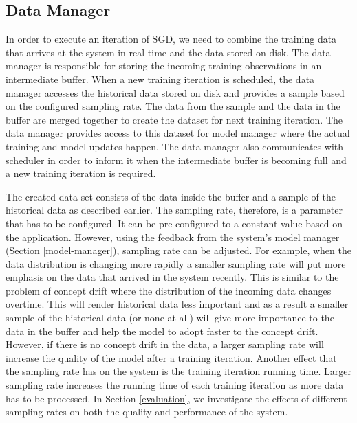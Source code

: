 \documentclass{vldb}
\begin{document}
\subsection{Data Manager} \label{data-manager}
In order to execute an iteration of SGD, we need to combine the training data that arrives at the system in real-time and the data stored on disk.
The data manager is responsible for storing the incoming training observations in an intermediate buffer.
When a new training iteration is scheduled, the data manager accesses the historical data stored on disk and provides a sample based on the configured sampling rate.
The data from the sample and the data in the buffer are merged together to create the dataset for next training iteration.
The data manager provides access to this dataset for model manager where the actual training and model updates happen.
The data manager also communicates with scheduler in order to inform it when the intermediate buffer is becoming full and a new training iteration is required. 

The created data set consists of the data inside the buffer and a sample of the historical data as described earlier.
The sampling rate, therefore, is a parameter that has to be configured.
It can be pre-configured to a constant value based on the application.
However, using the feedback from the system's model manager (Section \ref{model-manager}), sampling rate can be adjusted.
For example, when the data distribution is changing more rapidly a smaller sampling rate will put more emphasis on the data that arrived in the system recently. 
This is similar to the problem of concept drift where the distribution of the incoming data changes overtime.
This will render historical data less important and as a result a smaller sample of the historical data (or none at all) will give more importance to the data in the buffer and help the model to adopt faster to the concept drift.
However, if there is no concept drift in the data, a larger sampling rate will increase the quality of the model after a training iteration.
Another effect that the sampling rate has on the system is the training iteration running time.
Larger sampling rate increases the running time of each training iteration as more data has to be processed.
In Section \ref{evaluation}, we investigate the effects of different sampling rates on both the quality and performance of the system.
\end{document}
